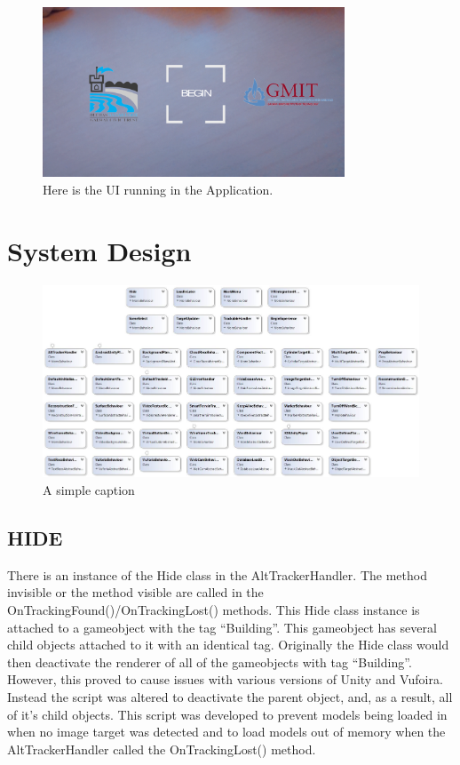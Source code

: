 \begin{figure}[ht!]
	\centering
	\includegraphics[width=90mm]{mainMenu}
	\caption{Here is the UI running in the Application. \label{overflow}}
\end{figure}

\chapter{System Design}
\begin{figure}[ht!]
	\centering
	\includegraphics[width=150mm]{uml.jpg}
	\caption{A simple caption \label{overflow}}
\end{figure}

\section{HIDE}
There is an instance of the Hide class in the AltTrackerHandler. The method invisible or the method visible are called in the OnTrackingFound()/OnTrackingLost() methods. This Hide class instance is attached to a gameobject with the tag “Building”. This gameobject has several child objects attached to it with an identical tag. Originally the Hide class would then deactivate the renderer of all of the gameobjects with tag “Building”.  However, this proved to cause issues with various versions of Unity and Vufoira. Instead the script was altered to deactivate the parent object, and, as a result, all of it's child objects. This script was developed to prevent models being loaded in when no image target was detected and to load models out of memory when the AltTrackerHandler called the OnTrackingLost() method.


